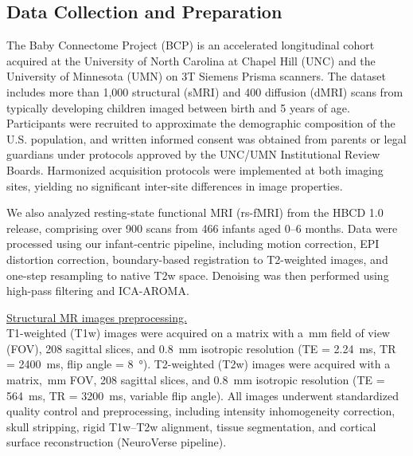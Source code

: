 \subsection{Data Collection and Preparation}
The Baby Connectome Project (BCP)\cite{howellUNCUMNBaby2019} is an accelerated longitudinal cohort acquired at the University of North Carolina at Chapel Hill (UNC) and the University of Minnesota (UMN) on 3T Siemens Prisma scanners. The dataset includes more than 1{,}000 structural (sMRI) and 400 diffusion (dMRI) scans from typically developing children imaged between birth and 5 years of age. Participants were recruited to approximate the demographic composition of the U.S. population, and written informed consent was obtained from parents or legal guardians under protocols approved by the UNC/UMN Institutional Review Boards. Harmonized acquisition protocols were implemented at both imaging sites, yielding no significant inter-site differences in image properties.

We also analyzed resting-state functional MRI (rs-fMRI) from the HBCD 1.0 release\cite{nelsonIntroductionHEALthyBrain2024}, comprising over 900 scans from 466 infants aged 0--6 months. Data were processed using our infant-centric pipeline, including motion correction, EPI distortion correction, boundary-based registration to T2-weighted images, and one-step resampling to native T2w space. Denoising was then performed using high-pass filtering and ICA-AROMA\cite{pruimICAAROMARobustICAbased2015}.

\noindent\underline{Structural MR images preprocessing.}
\hfill\\
T1-weighted (T1w) images were acquired on a  matrix with a \,\unit{\milli\meter} field of view (FOV), 208 sagittal slices, and \SI{0.8}{\milli\meter} isotropic resolution (TE = \SI{2.24}{\milli\second}, TR = \SI{2400}{\milli\second}, flip angle = \SI{8}{\degree}). 
T2-weighted (T2w) images were acquired with a  matrix, \,\unit{\milli\meter} FOV, 208 sagittal slices, and \SI{0.8}{\milli\meter} isotropic resolution (TE = \SI{564}{\milli\second}, TR = \SI{3200}{\milli\second}, variable flip angle). 
All images underwent standardized quality control and preprocessing\cite{liuMultistageImageQuality2019}, including intensity inhomogeneity correction, skull stripping, rigid T1w–T2w alignment, tissue segmentation, and cortical surface reconstruction (NeuroVerse pipeline)\cite{caliNeuroVerseImmersiveExploration2024}. 

